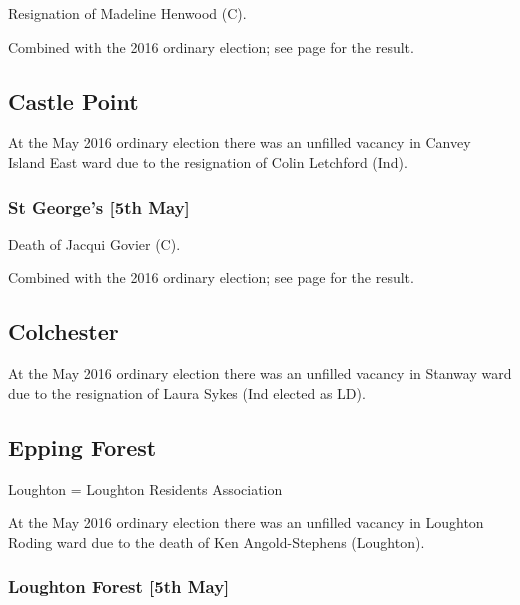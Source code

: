 \documentclass[a4paper,openany]{book}
\begin{document}
\begin{resultsiii}

Resignation of Madeline Henwood (C).

Combined with the 2016 ordinary election; see page \pageref{TippsCrossBrentwood} for the result.

\subsection*{Castle Point}

At the May 2016 ordinary election there was an unfilled vacancy in Canvey Island East ward due to the resignation of Colin Letchford (Ind).

\subsubsection*{St George's \hspace*{\fill}\nolinebreak[1]%
\enspace\hspace*{\fill}
[5th May]}


Death of Jacqui Govier (C).

Combined with the 2016 ordinary election; see page \pageref{StGeorgesCastlePoint} for the result.

\subsection*{Colchester}

At the May 2016 ordinary election there was an unfilled vacancy in Stanway ward due to the resignation of Laura Sykes (Ind elected as LD).

\subsection*{Epping Forest}

Loughton = Loughton Residents Association

At the May 2016 ordinary election there was an unfilled vacancy in Loughton Roding ward due to the death of Ken Angold-Stephens (Loughton).

\subsubsection*{Loughton Forest \hspace*{\fill}\nolinebreak[1]%
\enspace\hspace*{\fill}
[5th May]}


\end{resultsiii}
\end{document}
